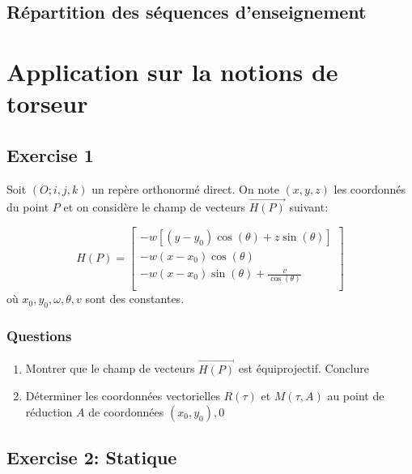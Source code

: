 \documentclass[
]{book}
\begin{document}
\hypertarget{ruxe9partition-des-suxe9quences-denseignement}{%
\section*{Répartition des séquences d'enseignement}\label{ruxe9partition-des-suxe9quences-denseignement}}

\hypertarget{application-sur-la-notions-de-torseur}{%
\chapter{Application sur la notions de torseur}\label{application-sur-la-notions-de-torseur}}

\hypertarget{exercise-1}{%
\section{Exercise 1}\label{exercise-1}}

Soit \((O; i, j, k)\) un repère orthonormé direct. On note \((x, y, z)\) les coordonnés du point \(P\) et on considère le champ de vecteurs \(\vec{H(P)}\) suivant:

\[
H(P) = 
\begin{bmatrix}
-w[(y - y_{0}) \cos(\theta) + z\sin(\theta) ] \\
-w(x - x_{0}) \cos(\theta) \\
-w(x - x_{0}) \sin(\theta) + \frac{v}{\cos(\theta)} \\
\end{bmatrix}
\]
où \(x_{0}, y_{0}, \omega, \theta, v\) sont des constantes.

\hypertarget{questions}{%
\subsection*{Questions}\label{questions}}

\begin{enumerate}
\def\labelenumi{\arabic{enumi}.}
\item
  Montrer que le champ de vecteurs \(\vec{H(P)}\) est équiprojectif. Conclure
\item
  Déterminer les coordonnées vectorielles \(R(\tau)\) et \(M(\tau, A)\) au point de réduction \(A\) de coordonnées \((x_{0}, y_{0}), 0\)
\end{enumerate}

\hypertarget{exercise-2-statique}{%
\section{Exercise 2: Statique}\label{exercise-2-statique}}
\end{document}
